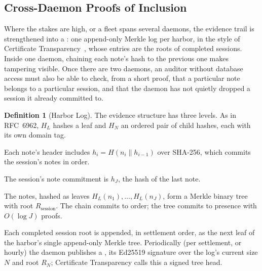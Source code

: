 \documentclass[11pt,a4paper]{article}
\theoremstyle{definition}
\newtheorem{definition}{Definition}[section]
\theoremstyle{remark}
\begin{document}
\subsection{Cross-Daemon Proofs of Inclusion}\label{sec:merkle-forest}

Where the stakes are high, or a fleet spans several daemons, the evidence trail is strengthened into a : one append-only Merkle log per harbor, in the style of Certificate Transparency~, whose entries are the roots of completed sessions. Inside one daemon, chaining each note's hash to the previous one makes tampering visible. Once there are two daemons, an auditor without database access must also be able to check, from a short proof, that a particular note belongs to a particular session, and that the daemon has not quietly dropped a session it already committed to.

\begin{definition}[Harbor Log]\label{def:merkle-forest}
\setlength{\parskip}{4pt plus 1pt}
The evidence structure has three levels. As in RFC~6962, $H_L$ hashes a leaf and $H_N$ an ordered pair of child hashes, each with its own domain tag.
\begin{description}[nosep]
  \item[Note chain.] Each note's header includes $h_i = H(n_i \mathbin{\|} h_{i-1})$ over SHA-256, which commits the session's notes in order.

The session's note commitment is $h_J$, the hash of the last note.


\item[Session root.] The notes, hashed as leaves $H_L(n_1),\ldots,H_L(n_J)$, form a Merkle binary tree with root $R_{\text{session}}$. The chain commits to order; the tree commits to presence with $O(\log J)$ proofs.
  \item[Harbor log.] Each completed session root is appended, in settlement order, as the next leaf of the harbor's single append-only Merkle tree. Periodically (per settlement, or hourly) the daemon publishes a , its Ed25519 signature over the log's current size $N$ and root $R_N$; Certificate Transparency calls this a signed tree head.
\end{description}
\end{definition}
\end{document}
